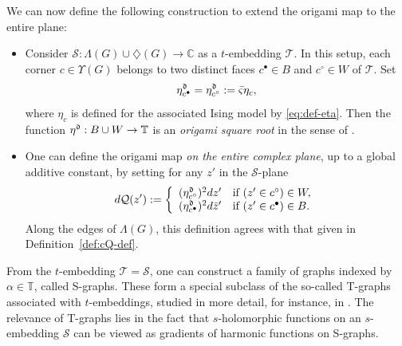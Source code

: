 \documentclass[reqno]{amsart}
\numberwithin{equation}{section}
\theoremstyle{definition}
\theoremstyle{remark}
\newcommand\C{\mathbb{C}}
\newcommand\cQ{\mathcal{Q}}
\newcommand\cS{\mathcal{S}}
\newcommand\cT{\mathcal{T}}
\begin{document}
We can now define the following construction to extend the origami map to the entire plane:
\begin{itemize}
    \item Consider $\cS:\Lambda(G) \cup \diamondsuit(G) \to \C$ as a $t$-embedding $\cT$. In this setup, each corner $c \in \Upsilon(G)$ belongs to two distinct faces $c^\bullet \in B$ and $c^\circ \in W$ of $\cT$. Set
    \begin{equation}\label{eq:eta_origami_dimers}
        \eta^{\frak{d}}_{c^\bullet} = \eta^{\frak{d}}_{c^{\circ}} := \bar{\varsigma}\eta_c,
    \end{equation}
    where $\eta_c$ is defined for the associated Ising model by \eqref{eq:def-eta}. Then the function $\eta^{\frak{d}} : B \cup W \to \mathbb{T}$ is an \emph{origami square root} in the sense of \cite[Definition~2.4]{CLR1}.
    
    \item One can define the origami map \emph{on the entire complex plane}, up to a global additive constant, by setting for any $z'$ in the $\cS$-plane
    $$
    d\cQ(z') :=
    \left\{
        \begin{array}{ll}
            (\eta^{\frak{d}}_{c^{\circ}})^2 dz' & \text{if } (z' \in c^\circ) \in W,\\
            (\eta^{\frak{d}}_{c^{\bullet}})^2 d\bar{z}' & \text{if } (z' \in c^\bullet) \in B.
        \end{array}
    \right.
    $$
    Along the edges of $\Lambda(G)$, this definition agrees with that given in Definition~\ref{def:cQ-def}.
\end{itemize}
From the $t$-embedding $\cT = \cS$, one can construct a family of graphs indexed by $\alpha \in \mathbb{T}$, called S-graphs. These form a special subclass of the so-called T-graphs associated with $t$-embeddings, studied in more detail, for instance, in \cite[Section~2.3]{Che20}. The relevance of T-graphs lies in the fact that $s$-holomorphic functions on an $s$-embedding $\cS$ can be viewed as gradients of harmonic functions on S-graphs.
 
\end{document}
